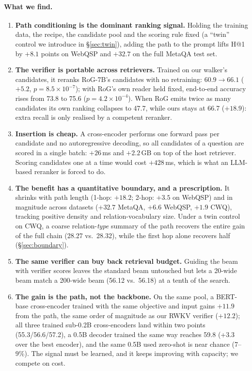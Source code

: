 \documentclass[sigconf,review]{acmart}
\begin{document}
\paragraph{What we find.}
\begin{enumerate}
\item \textbf{Path conditioning is the dominant ranking signal.} Holding the training data, the recipe, the candidate pool and the scoring rule fixed (a ``twin'' control we introduce in \S\ref{sec:twin}), adding the path to the prompt lifts H@1 by $+8.1$ points on WebQSP and $+32.7$ on the full MetaQA test set.
\item \textbf{The verifier is portable across retrievers.} Trained on our walker's candidates, it reranks RoG-7B's candidates with no retraining: $60.9\to66.1$ ($+5.2$, $p=8.5\times10^{-7}$); with RoG's own reader held fixed, end-to-end accuracy rises from 73.8 to 75.6 ($p=4.2\times10^{-4}$). When RoG emits twice as many candidates its own ranking collapses to 47.7, while ours stays at 66.7 ($+18.9$): extra recall is only realised by a competent reranker.
\item \textbf{Insertion is cheap.} A cross-encoder performs one forward pass per candidate and no autoregressive decoding, so all candidates of a question are scored in a single batch: $+26$\,ms and $+2.2$\,GB on top of the host retriever. Scoring candidates one at a time would cost $+428$\,ms, which is what an LLM-based reranker is forced to do.
\item \textbf{The benefit has a quantitative boundary, and a prescription.} It shrinks with path length (1-hop: $+18.2$; 2-hop: $+3.5$ on WebQSP) and in magnitude across datasets ($+32.7$ MetaQA, $+6.6$ WebQSP, $+1.9$ CWQ), tracking positive density and relation-vocabulary size. Under a twin control on CWQ, a coarse relation-\emph{type} summary of the path recovers the entire gain of the full chain (28.27 vs.\ 28.32), while the first hop alone recovers half (\S\ref{sec:boundary}).
\item \textbf{The same verifier can buy back retrieval budget.} Guiding the beam with verifier scores leaves the standard beam untouched but lets a 20-wide beam match a 200-wide beam (56.12 vs.\ 56.18) at a tenth of the search.
\item \textbf{The gain is the path, not the backbone.} On the same pool, a BERT-base cross-encoder trained with the same objective and input gains $+11.9$ from the path, the same order of magnitude as our RWKV verifier ($+12.2$); all three trained sub-0.2B cross-encoders land within two points (55.3/56.6/57.2), a 0.5B decoder trained the same way reaches 59.8 (+3.3 over the best encoder), and the same 0.5B used zero-shot is near chance (7--9\%). The signal must be learned, and it keeps improving with capacity; we compete on cost.
\end{enumerate}
\end{document}
